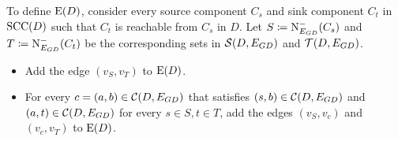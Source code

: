 \begin{theorem}
\begin{lemma}
\begin{theorem}
\begin{itemize}
    To define $\operatorname{E}({D})$, consider every source component $C_s$ and sink component $C_t$ in $\operatorname{\textrm{SCC}}({D})$ such that $C_t$ is reachable from $C_s$ in $D$. Let $S \coloneqq \operatorname{N}^{-}_{E_{{G}{D}}}({C_s})$ and $T \coloneqq \operatorname{N}^{-}_{E_{{G}{D}}}({C_t})$ be the corresponding sets in $\operatorname{\mathcal{S}}({D,E_{{G}{D}}})$ and $\operatorname{\mathcal{T}}({D,E_{{G}{D}}})$.
    \begin{itemize}
        \item Add the edge $(v_S, v_T)$ to $\operatorname{E}({D})$.
        \item For every $c = (a,b) \in \operatorname{\mathcal{C}}({D,E_{{G}{D}}})$ that satisfies $(s,b) \in \operatorname{\mathcal{C}}({D,E_{{G}{D}}})$ and $(a,t) \in \operatorname{\mathcal{C}}({D,E_{{G}{D}}})$ for every $s \in S, t \in T$, add the edges $(v_S, v_c)$ and $(v_c, v_T)$ to $\operatorname{E}({D})$.
    \end{itemize}
 \end{itemize}



\end{theorem}
\end{lemma}
\end{theorem}
